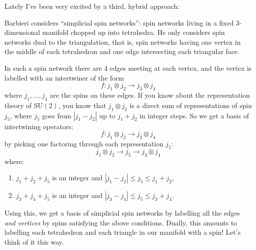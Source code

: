 \documentclass{article}
\def\tightlist{}
\renewcommand{\texttt}[1]{%
  \begingroup
  \ttfamily
  \begingroup\lccode`~=`/\lowercase{\endgroup\def~}{/\discretionary{}{}{}}%
  \begingroup\lccode`~=`[\lowercase{\endgroup\def~}{[\discretionary{}{}{}}%
  \begingroup\lccode`~=`.\lowercase{\endgroup\def~}{.\discretionary{}{}{}}%
  \catcode`/=\active\catcode`[=\active\catcode`.=\active
  \scantokens{#1\noexpand}%
  \endgroup
}
\begin{document}
Lately I've been very excited by a third, hybrid approach:


Barbieri considers ``simplicial spin networks'': spin networks living in
a fixed 3-dimensional manifold chopped up into tetrahedra. He only
considers spin networks dual to the triangulation, that is, spin
networks having one vertex in the middle of each tetrahedron and one
edge intersecting each triangular face.

In such a spin network there are 4 edges meeting at each vertex, and the
vertex is labelled with an intertwiner of the form
\[f\colon j_1 \otimes j_2\to j_3 \otimes j_4\] where \(j_1,\ldots,j_4\)
are the spins on these edges. If you know about the representation
theory of \(\mathrm{SU}(2)\), you know that \(j_1 \otimes j_2\) is a
direct sum of representations of spin \(j_5\), where \(j_5\) goes from
\(|j_1 - j_2|\) up to \(j_1 + j_2\) in integer steps. So we get a basis
of intertwining operators:
\[f\colon j_1 \otimes j_2\to j_3 \otimes j_4\] by picking one factoring
through each representation \(j_5\):
\[j_1 \otimes j_2\to j_5\to j_3 \otimes j_4\] where:

\begin{enumerate}
\def\labelenumi{\alph{enumi})}
\item
  \(j_1 + j_2 + j_5\) is an integer and
  \(|j_1 - j_2| \leqslant j_5 \leqslant j_1 + j_2\),
\item
  \(j_3 + j_4 + j_5\) is an integer and
  \(|j_3 - j_4| \leqslant j_5 \leqslant j_3 + j_4\).
\end{enumerate}

Using this, we get a basis of simplicial spin networks by labelling all
the edges \emph{and vertices} by spins satisfying the above conditions.
Dually, this amounts to labelling each tetrahedron and each triangle in
our manifold with a spin! Let's think of it this way.
\end{document}
